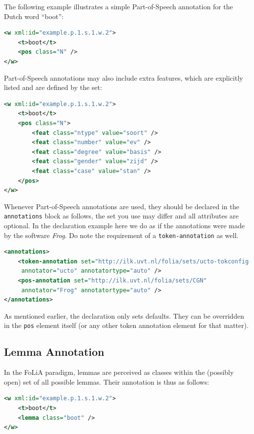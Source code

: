 \documentclass[a4paper,12pt]{report}
\begin{document}
The following example illustrates a simple Part-of-Speech annotation for the Dutch word ``boot'':

\begin{lstlisting}[language=xml]
<w xml:id="example.p.1.s.1.w.2">
    <t>boot</t>
    <pos class="N" />
</w>
\end{lstlisting}

Part-of-Speech annotations may also include extra features, which are explicitly listed and are defined by the set:

\begin{lstlisting}[language=xml]
<w xml:id="example.p.1.s.1.w.2">
    <t>boot</t>
    <pos class="N">
        <feat class="ntype" value="soort" />
        <feat class="number" value="ev" />
        <feat class="degree" value="basis" />
        <feat class="gender" value="zijd" />
        <feat class="case" value="stan" />
    </pos>
</w>
\end{lstlisting}

Whenever Part-of-Speech annotations are used, they should be declared in the \texttt{annotations} block as follows, the set you use may differ and all attributes are optional. In the declaration example here we do as if the annotations were made by the software \emph{Frog}. Do note the requirement of a \texttt{token-annotation} as well.

\begin{lstlisting}[language=xml]
<annotations>
    <token-annotation set="http://ilk.uvt.nl/folia/sets/ucto-tokconfig-nl" 
     annotator="ucto" annotatortype="auto" />
    <pos-annotation set="http://ilk.uvt.nl/folia/sets/CGN" 
     annotator="Frog" annotatortype="auto" />
</annotations>
\end{lstlisting}

As mentioned earlier, the declaration only sets defaults. They can be overridden in the \texttt{pos} element itself (or any other token annotation element for that matter).

\subsection{Lemma Annotation}

In the FoLiA paradigm, lemmas are perceived as classes within the (possibly open) set of all possible lemmas. Their annotation is thus as follows:

\begin{lstlisting}[language=xml]
<w xml:id="example.p.1.s.1.w.2">
    <t>boot</t>
    <lemma class="boot" />
</w>
\end{lstlisting}
\end{document}
